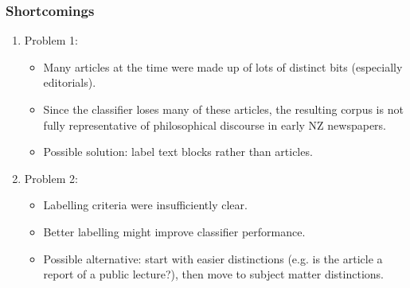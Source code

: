 \documentclass[10pt, compress]{beamer}
\begin{document}
\begin{frame}
	\frametitle{Shortcomings}

	\pause

  \begin{enumerate}[<+- | alert@+>]
		\item Problem 1:
		\begin{itemize}
		\item Many articles at the time were made up of lots of distinct bits (especially editorials).
		\item Since the classifier loses many of these articles, the resulting corpus is not fully representative of philosophical discourse in early NZ newspapers.
		\item Possible solution: label text blocks rather than articles.
	\end{itemize}
	\item Problem 2:
		\begin{itemize}
			\item Labelling criteria were insufficiently clear.
			\item Better labelling might improve classifier performance.
			\item Possible alternative: start with easier distinctions (e.g. is the article a report of a public lecture?), then move to subject matter distinctions.
		\end{itemize}
	\end{enumerate}

\end{frame}
\end{document}
